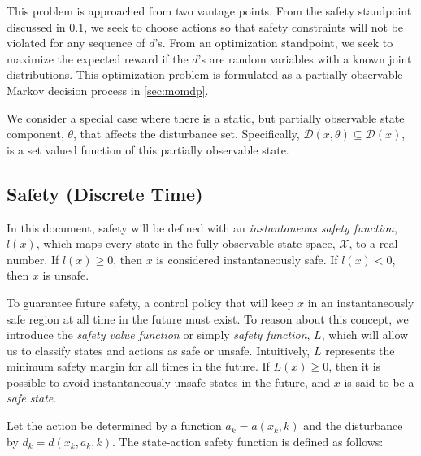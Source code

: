 \documentclass{article}
\newcommand{\aspace}{\ensuremath{\mathcal{A}} }
\newcommand{\dstate}{\theta}
\begin{document}
This problem is approached from two vantage points.
From the safety standpoint discussed in \cref{sec:safety}, we seek to choose actions so that safety constraints will not be violated for any sequence of $d$'s.
From an optimization standpoint, we seek to maximize the expected reward if the $d$'s are random variables with a known joint distributions.
This optimization problem is formulated as a partially observable Markov decision process in \cref{sec:momdp}.

We consider a special case where there is a static, but partially observable state component, $\dstate$, that affects the disturbance set.
Specifically, $\mathcal{D}(x,\dstate) \subseteq \mathcal{D}(x)$, is a set valued function of this partially observable state.

\subsection{Safety (Discrete Time)} \label{sec:safety}

In this document, safety will be defined with an \emph{instantaneous safety function}, $l(x)$, which maps every state in the fully observable state space, $\mathcal{X}$, to a real number.
If $l(x) \geq 0$, then $x$ is considered instantaneously safe. If $l(x) < 0$, then $x$ is unsafe.

To guarantee future safety, a control policy that will keep $x$ in an instantaneously safe region at all time in the future must exist.
To reason about this concept, we introduce the \emph{safety value function} or simply \emph{safety function}, $L$, which will allow us to classify states and actions as safe or unsafe.
Intuitively, $L$ represents the minimum safety margin for all times in the future.
If $L(x) \geq 0$, then it is possible to avoid instantaneously unsafe states in the future, and $x$ is said to be a \emph{safe state}.  

Let the action be determined by a function $a_k = a(x_k, k)$ and the disturbance by $d_k = d(x_k, a_k, k)$.
The state-action safety function is defined as follows:
\end{document}
